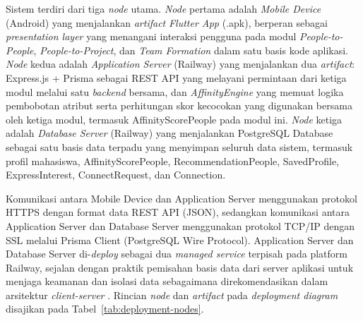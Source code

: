 Sistem terdiri dari tiga \emph{node} utama. \emph{Node} pertama adalah \emph{Mobile Device} (Android) yang menjalankan \emph{artifact} \emph{Flutter App} (.apk), berperan sebagai \emph{presentation layer} yang menangani interaksi pengguna pada modul \emph{People-to-People}, \emph{People-to-Project}, dan \emph{Team Formation} dalam satu basis kode aplikasi. \emph{Node} kedua adalah \emph{Application Server} (Railway) yang menjalankan dua \emph{artifact}: Express.js + Prisma sebagai REST API yang melayani permintaan dari ketiga modul melalui satu \emph{backend} bersama, dan \emph{AffinityEngine} yang memuat logika pembobotan atribut serta perhitungan skor kecocokan yang digunakan bersama oleh ketiga modul, termasuk AffinityScorePeople pada modul ini. \emph{Node} ketiga adalah \emph{Database Server} (Railway) yang menjalankan PostgreSQL Database sebagai satu basis data terpadu yang menyimpan seluruh data sistem, termasuk profil mahasiswa, AffinityScorePeople, RecommendationPeople, SavedProfile, ExpressInterest, ConnectRequest, dan Connection.

Komunikasi antara Mobile Device dan Application Server menggunakan protokol HTTPS dengan format data REST API (JSON), sedangkan komunikasi antara Application Server dan Database Server menggunakan protokol TCP/IP dengan SSL melalui Prisma Client (PostgreSQL Wire Protocol). Application Server dan Database Server di-\emph{deploy} sebagai dua \emph{managed service} terpisah pada platform Railway, sejalan dengan praktik pemisahan basis data dari server aplikasi untuk menjaga keamanan dan isolasi data sebagaimana direkomendasikan dalam arsitektur \emph{client-server} \autocite{sommerville2016}. Rincian \emph{node} dan \emph{artifact} pada \emph{deployment diagram} disajikan pada Tabel~\ref{tab:deployment-nodes}.

